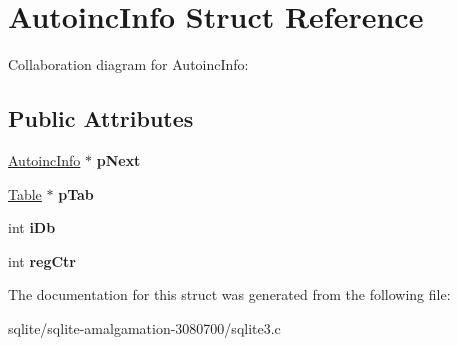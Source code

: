 \hypertarget{struct_autoinc_info}{\section{Autoinc\+Info Struct Reference}
\label{struct_autoinc_info}
}


Collaboration diagram for Autoinc\+Info\+:
\subsection*{Public Attributes}
\begin{DoxyCompactItemize}
\item 
\hypertarget{struct_autoinc_info_aa77fb076beea013c25df4e49dba4b6f6}{\hyperlink{struct_autoinc_info}{Autoinc\+Info} $\ast$ {\bfseries p\+Next}}\label{struct_autoinc_info_aa77fb076beea013c25df4e49dba4b6f6}

\item 
\hypertarget{struct_autoinc_info_a0cf785b0cbaddb4215a8408f8e13075e}{\hyperlink{struct_table}{Table} $\ast$ {\bfseries p\+Tab}}\label{struct_autoinc_info_a0cf785b0cbaddb4215a8408f8e13075e}

\item 
\hypertarget{struct_autoinc_info_ae7234e0916b11ef97377bdfd6c7c4568}{int {\bfseries i\+Db}}\label{struct_autoinc_info_ae7234e0916b11ef97377bdfd6c7c4568}

\item 
\hypertarget{struct_autoinc_info_af180977ee7dcc8cab862185692f57cc5}{int {\bfseries reg\+Ctr}}\label{struct_autoinc_info_af180977ee7dcc8cab862185692f57cc5}

\end{DoxyCompactItemize}


The documentation for this struct was generated from the following file\+:\begin{DoxyCompactItemize}
\item 
sqlite/sqlite-\/amalgamation-\/3080700/sqlite3.\+c\end{DoxyCompactItemize}

